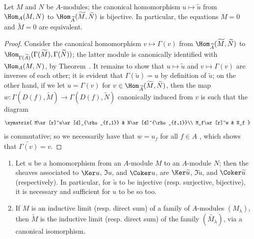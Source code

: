 \begin{corollary}[1.3.8]
\label{I.1.3.8}
Let $M$ and $N$ be $A$-modules;
the canonical homomorphism $u\mapsto\widetilde{u}$ from $\Hom_A(M,N)$ to $\Hom_{\widetilde{A}}(\widetilde{M},\widetilde{N})$ is bijective.
In particular, the equations $M=0$ and $\widetilde{M}=0$ are equivalent.
\end{corollary}

\begin{proof}
Consider the canonical homomorphism $v\mapsto\Gamma(v)$ from $\Hom_{\widetilde{A}}(\widetilde{M},\widetilde{N})$ to $\Hom_{\Gamma(\widetilde{A})}(\Gamma(\widetilde{M}),\Gamma(\widetilde{N}))$;
the latter module is canonically identified with $\Hom_A(M,N)$, by Theorem~.
It remains to show that $u\mapsto\widetilde{u}$ and $v\mapsto\Gamma(v)$ are inverses of each other;
it is evident that $\Gamma(\widetilde{u})=u$ by definition of $\widetilde{u}$;
on the other hand, if we let $u=\Gamma(v)$ for $v\in\Hom_{\widetilde{A}}(\widetilde{M},\widetilde{N})$, then the map $w:\Gamma(D(f),\widetilde{M})\to\Gamma(D(f),\widetilde{N})$ canonically induced from $v$ is such that the diagram
\[
  \xymatrix{
    M\ar[r]^u\ar[d]_{\rho_{f,1}} & N\ar[d]^{\rho_{f,1}}\\
    M_f\ar[r]^w & N_f
  }
\]
is commutative;
so we necessarily have that $w=u_f$ for all $f\in A$ , which shows that $\widetilde{\Gamma(v)}=v$.
\end{proof}

\begin{corollary}[1.3.9]
\label{I.1.3.9}
\medskip\noindent
\begin{enumerate}
  \item[{\rm(i)}] Let $u$ be a homomorphism from an $A$-module $M$ to an $A$-module $N$;
    then the sheaves associated to $\Ker u$, $\Im u$, and $\Coker u$, are $\Ker\widetilde{u}$, $\Im\widetilde{u}$, and $\Coker\widetilde{u}$ (respectively).
    In particular, for $\widetilde{u}$ to be injective (resp. surjective, bijective), it is necessary and sufficient for $u$ to be so too.
  \item[{\rm(ii)}] If $M$ is an inductive limit (resp. direct sum) of a family of $A$-modules $(M_\lambda)$, then $\widetilde{M}$ is the inductive limit (resp. direct sum) of the family $(\widetilde{M_\lambda})$, via a canonical isomorphism.
\end{enumerate}
\end{corollary}

